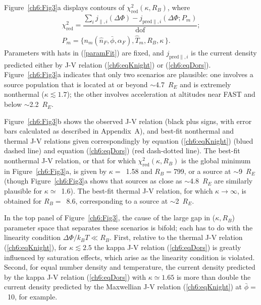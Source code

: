   Figure~\ref{ch6:Fig3}a displays contours of $\chi^2_{\textrm{red}} ( \kappa,
  R_B )$, where
  \begin{subequations}
    \begin{align} \chi^2_{\mathrm{red}} = \dfrac{\sum_i j_{\parallel,i} (\Delta \Phi) - j_{\textrm{pred}\parallel,i}(\Delta \Phi; P_m)}{\mathrm{dof}}; \\
      P_m = \Big \{ n_m ( \hat{n}_F, \bar{\phi} , \alpha_F ), \hat{T}_m, R_B,
      \kappa \, \Big \}. \label{paramFit}
    \end{align}
  \end{subequations}
  Parameters with hats in (\ref{paramFit}) are fixed, and
  $j_{\textrm{pred}\parallel,i} $ is the current density predicted either by J-V
  relation (\ref{ch6:eqKnight}) or (\ref{ch6:eqDors}). Figure~\ref{ch6:Fig3}a
  indicates that only two scenarios are plausible: one involves a source
  population that is located at or beyond $\sim$4.7~$R_E$ and is extremely
  nonthermal ($\kappa \lesssim 1.7$); the other involves acceleration at
  altitudes near FAST and below $\sim$2.2~$R_E$.

  Figure~\ref{ch6:Fig3}b shows the observed J-V relation (black plus signs, with
  error bars calculated as described in Appendix~A), and best-fit nonthermal and
  thermal J-V relations given correspondingly by equation (\ref{ch6:eqKnight})
  (blued dashed line) and equation (\ref{ch6:eqDors}) (red dash-dotted
  line). The best-fit nonthermal J-V relation, or that for which
  $\chi^2_{\textrm{red}} ( \kappa, R_B )$ is the global minimum in
  Figure~\ref{ch6:Fig3}a, is given by $\kappa =$~1.58 and $R_B =$799, or a
  source at $\sim$9~$R_E$ (though Figure~\ref{ch6:Fig3}a shows that sources as
  close as $\sim$4.8~$R_E$ are similarly plausible for $\kappa \simeq$~1.6). The
  best-fit thermal J-V relation, for which $\kappa \rightarrow \infty$, is
  obtained for $R_B =$~8.6, corresponding to a source at $\sim$2~$R_E$.

  In the top panel of Figure~\ref{ch6:Fig3}, the cause of the large gap in
  ($\kappa, R_B$) parameter space that separates these scenarios is bifold; each
  has to do with the linearity condition $\Delta \Phi / k_B T \ll R_B $. First,
  relative to the thermal J-V relation (\ref{ch6:eqKnight}), for $\kappa
  \lesssim 2.5$ the kappa J-V relation (\ref{ch6:eqDors}) is greatly influenced
  by saturation effects, which arise as the linearity condition is
  violated. Second, for equal number density and temperature, the current
  density predicted by the kappa J-V relation (\ref{ch6:eqDors}) with $\kappa
  \simeq 1.65$ is more than double the current density predicted by the
  Maxwellian J-V relation (\ref{ch6:eqKnight}) at $\bar{\phi} =$~10, for
  example.

